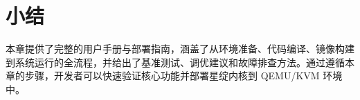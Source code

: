 \section{小结}

本章提供了完整的用户手册与部署指南，涵盖了从环境准备、代码编译、镜像构建到系统运行的全流程，并给出了基准测试、调优建议和故障排查方法。通过遵循本章的步骤，开发者可以快速验证核心功能并部署星绽内核到 QEMU/KVM 环境中。